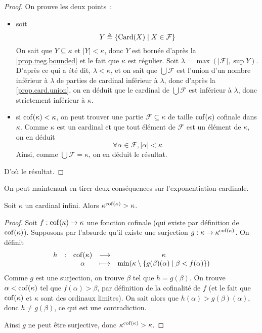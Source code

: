 \begin{proof}
  On prouve les deux points~:
  \begin{itemize}
  \item soit
    \[Y \triangleq \{\operatorname{Card}(X) \mid X \in \mathcal F\}\]
    On sait que $Y\subseteq \kappa$ et $|Y| < \kappa$, donc $Y$ est bornée
    d'après la \cref{prop.ineg.bounded} et le fait que $\kappa$ est régulier.
    Soit $\lambda = \max(|\mathcal F|, \sup Y)$. D'après ce qui a été dit,
    $\lambda < \kappa$, et on sait que $\bigcup \mathcal F$ est l'union d'un
    nombre inférieur à $\lambda$ de parties de cardinal inférieur à $\lambda$,
    donc d'après la \cref{prop.card.union}, on en déduit que le cardinal de
    $\bigcup \mathcal F$ est inférieur à $\lambda$, donc strictement inférieur
    à $\kappa$.
  \item si $\operatorname{cof}(\kappa) < \kappa$, on peut trouver une partie
    $\mathcal F\subseteq \kappa$ de taille $\operatorname{cof}(\kappa)$ cofinale dans
    $\kappa$. Comme $\kappa$ est un cardinal et que tout élément de $\mathcal F$
    est un élément de $\kappa$, on en déduit
    \[\forall \alpha \in \mathcal F, |\alpha| < \kappa\]
    Ainsi, comme $\bigcup \mathcal F = \kappa$, on en déduit le résultat.
  \end{itemize}
  D'où le résultat.
\end{proof}

On peut maintenant en tirer deux conséquences sur l'exponentiation cardinale.

\begin{proposition}
  Soit $\kappa$ un cardinal infini. Alors $\kappa^{\operatorname{cof}(\kappa)} > \kappa$.
\end{proposition}

\begin{proof}
  Soit $f : \operatorname{cof}(\kappa) \to \kappa$ une fonction cofinale (qui existe par
  définition de $\operatorname{cof}(\kappa)$). Supposons par l'absurde qu'il existe une
  surjection $g : \kappa \to \kappa^{\operatorname{cof}(\kappa)}$. On définit
  \[\begin{array}{ccccc}
  h & : & \operatorname{cof}(\kappa) & \longrightarrow & \kappa \\
  & & \alpha & \longmapsto &
  \min(\kappa \setminus\{g(\beta)(\alpha)\mid \beta < f(\alpha)\})
  \end{array}\]
  Comme $g$ est une surjection, on trouve $\beta$ tel que $h = g(\beta)$. On
  trouve $\alpha < \operatorname{cof}(\kappa)$ tel que $f(\alpha) > \beta$, par définition de
  la cofinalité de $f$ (et le fait que $\operatorname{cof}(\kappa)$ et $\kappa$ sont des
  ordinaux limites). On sait alors que $h(\alpha) > g(\beta)(\alpha)$, donc
  $h\neq g(\beta)$, ce qui est une contradiction.

  Ainsi $g$ ne peut être surjective, donc $\kappa^{\operatorname{cof}(\kappa)} > \kappa$.
\end{proof}


